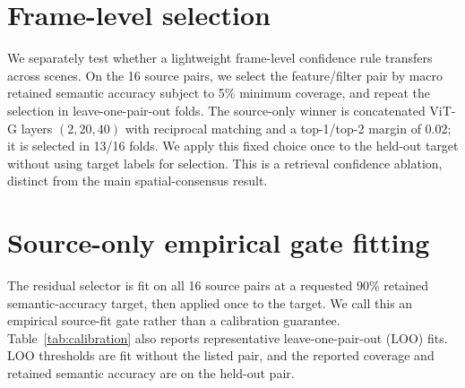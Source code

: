 \documentclass[10pt,twocolumn]{article}
\begin{document}
\begin{table}[t]
\centering
\scriptsize
\resizebox{\columnwidth}{!}{}
\caption{Descriptor-permutation negative control.}
\label{tab:negative-control}
\end{table}

\section{Frame-level selection}

We separately test whether a lightweight frame-level confidence rule transfers
across scenes. On the 16 source pairs, we select the feature/filter pair by
macro retained semantic accuracy subject to 5\% minimum coverage, and repeat the
selection in leave-one-pair-out folds. The source-only winner is concatenated
ViT-G layers $(2,20,40)$ with reciprocal matching and a top-1/top-2 margin of
0.02; it is selected in 13/16 folds. We apply this fixed choice once to the
held-out target without using target labels for selection. This is a retrieval
confidence ablation, distinct from the main spatial-consensus result.

\begin{table}[t]
\centering
\scriptsize
\resizebox{\columnwidth}{!}{}
\caption{Source-only frame-level confidence selection. The target row uses the
configuration selected on source pairs only.}
\label{tab:framelevel}
\end{table}

\section{Source-only empirical gate fitting}

The residual selector is fit on all 16 source pairs at a requested 90\%
retained semantic-accuracy target, then applied once to the target. We call
this an empirical source-fit gate rather than a calibration guarantee.
Table~\ref{tab:calibration} also reports representative leave-one-pair-out
(LOO) fits. LOO thresholds are
fit without the listed pair, and the reported coverage and retained semantic
accuracy are on the held-out pair.

\begin{table}[t]
\centering
\scriptsize
\resizebox{\columnwidth}{!}{}
\caption{Empirical source-fit residual gate. The all-source row is evaluated on the target;
LOO rows are evaluated on the held-out source pair.}
\label{tab:calibration}
\end{table}
\end{document}
